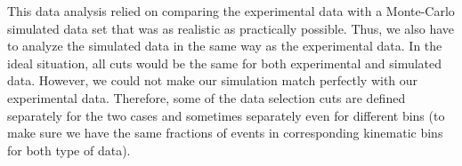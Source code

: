 This data analysis relied on comparing the experimental data with a Monte-Carlo simulated data set that was as realistic as practically possible. %
Thus, we also have to analyze the simulated data in the same way as the experimental data. %
In the ideal situation, all cuts would be the same for both %
experimental and simulated data. However, %
we could not make our simulation match perfectly with our experimental data.%
Therefore, some of the data selection cuts are defined separately for the two cases and sometimes separately even for different \qsqs bins (to make sure we have the same fractions of events in corresponding kinematic bins for %
both type of data).











\clearpage
